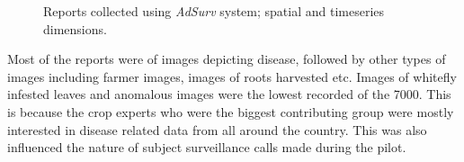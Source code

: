 \documentclass[letterpaper]{article} %
\begin{document}
\begin{figure}[!h]
  \centering
    \caption{Reports collected using \emph{AdSurv} system; spatial and timeseries dimensions.}
    \label{reports}
\end{figure}

 


 


Most of the reports were of images depicting disease, followed by other types of images including farmer images, images of roots harvested etc. Images of whitefly infested leaves and anomalous images were the lowest recorded of the 7000. This is because the crop experts who were the biggest contributing group were mostly interested in disease related data from all around the country. This was also influenced the nature of subject surveillance calls made during the pilot.
\end{document}

